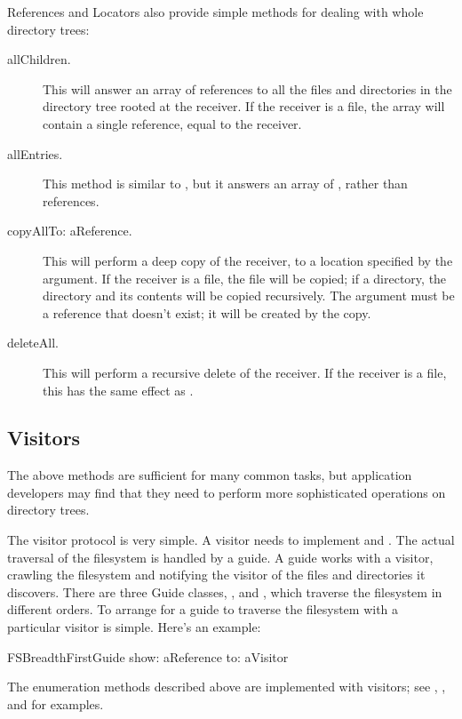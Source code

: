 \documentclass[a4paper,10pt,twoside]{book}
\begin{document}
References and Locators also provide simple methods for dealing with whole directory trees:

\begin{description}
\item[allChildren.]

This will answer an array of references to all the files and directories in the directory tree rooted at the receiver. If the receiver is a file, the array will contain a single reference, equal to the receiver.

\item[allEntries.]
This method is similar to , but it answers an array of , rather than references.

\item[copyAllTo: aReference.]

This will perform a deep copy of the receiver, to a location specified by the argument. If the receiver is a file, the file will be copied; if a directory, the directory and its contents will be copied recursively. The argument must be a reference that doesn't exist; it will be created by the copy.

\item[deleteAll.]

This will perform a recursive delete of the receiver. If the receiver is a file, this has the same effect as .
\end{description}

\subsection{Visitors}

The above methods are sufficient for many common tasks, but application developers may find that they need to perform more sophisticated operations on directory trees.

The visitor protocol is very simple. A visitor needs to implement  and . The actual traversal of the filesystem is handled by a guide. A guide works with a visitor, crawling the filesystem and notifying the visitor of the files and directories it discovers. There are three Guide classes, ,  and  , which traverse the filesystem in different orders. To arrange for a guide to traverse the filesystem with a particular visitor is simple. Here's an example:

\begin{code}{}
    FSBreadthFirstGuide show: aReference to: aVisitor
\end{code}	

The enumeration methods described above are implemented with visitors; see , , and  for examples.



\ifx\wholebook\relax\else
   
   
\end{document}
